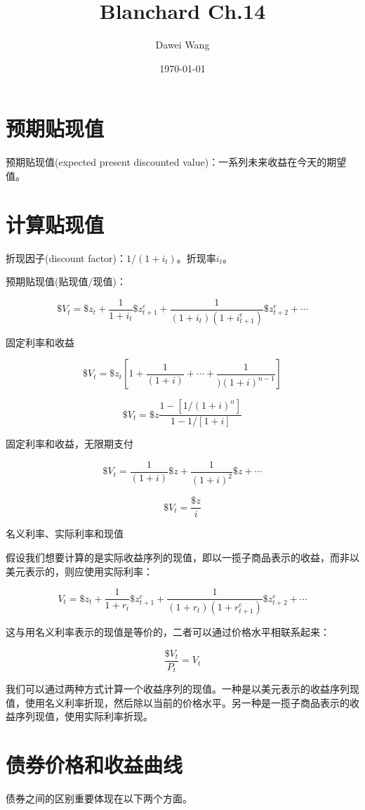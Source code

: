 \documentclass{article}
\title{Blanchard Ch.14}
\author{Dawei Wang}
\date{\today}
\begin{document}
	\maketitle	
\section{预期贴现值}

预期贴现值(expected present discounted value)：一系列未来收益在今天的期望值。

\section{计算贴现值}

折现因子(discount factor)：$ 1/(1+i_t) $。折现率$ i_t $。

预期贴现值(贴现值/现值)：

\[
\$V_t=\$z_t+\frac{1}{1+i_t}\$z_{t+1}^e+\frac{1}{(1+i_t)(1+i_{t+1}^e)}\$z_{t+2}^e+\cdots
\]

固定利率和收益

\[
\$V_t=\$z_t[1+\frac{1}{(1+i)}+\cdots+\frac{1}{)(1+i)^{n-1}}]
\]

\[
\$V_t=\$z\frac{1-[1/(1+i)^n]}{1-1/[1+i]}
\]

固定利率和收益，无限期支付

\[
\$V_t=\frac{1}{(1+i)}\$z+\frac{1}{(1+i)^2}\$z+\cdots
\]

\[
\$V_t=\frac{\$z}{i}
\]

\hspace*{\fill}

名义利率、实际利率和现值

假设我们想要计算的是实际收益序列的现值，即以一揽子商品表示的收益，而非以美元表示的，则应使用实际利率：

\[
V_t=\$z_t+\frac{1}{1+r_t}\$z_{t+1}^e+\frac{1}{(1+r_t)(1+r_{t+1}^e)}\$z_{t+2}^e+\cdots
\]

这与用名义利率表示的现值是等价的，二者可以通过价格水平相联系起来：

\[
\frac{\$V_t}{P_t}=V_t
\]

我们可以通过两种方式计算一个收益序列的现值。一种是以美元表示的收益序列现值，使用名义利率折现，然后除以当前的价格水平。另一种是一揽子商品表示的收益序列现值，使用实际利率折现。

\section{债券价格和收益曲线}

债券之间的区别重要体现在以下两个方面。
\end{document}
